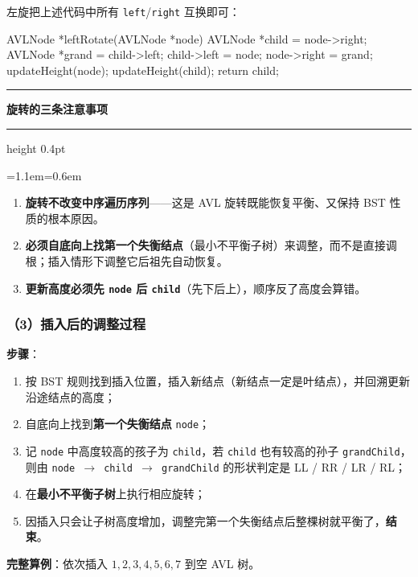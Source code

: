 \documentclass[11pt,openany,UTF8]{ctexbook}
\newcommand{\callouthead}[2]{%
  \par\addvspace{7pt}\noindent
  {\color{#1}\rule[-0.15em]{3pt}{1.05em}}\hspace{0.5em}%
  {\bfseries\color{#1}#2}\par\nobreak\vspace{-0.35em}%
  {\color{rulesep}\hrule height 0.4pt}\nobreak\vspace{0.45em}%
  \begingroup\small\setlength{\parindent}{0pt}%
  \leftskip=1.1em\rightskip=0.6em\noindent\ignorespaces}
\newcommand{\calloutend}{\par\endgroup\addvspace{7pt}}
\newenvironment{callwarn}[1]{\callouthead{warnbar}{#1}}{\calloutend}
\begin{document}
左旋把上述代码中所有 \texttt{left}/\texttt{right} 互换即可：

\begin{codebox}
AVLNode *leftRotate(AVLNode *node) {
    AVLNode *child = node->right;
    AVLNode *grand = child->left;
    child->left  = node;
    node->right  = grand;
    updateHeight(node);
    updateHeight(child);
    return child;
}
\end{codebox}

\begin{callwarn}{旋转的三条注意事项}
\begin{enumerate}
\item \textbf{旋转不改变中序遍历序列}——这是 AVL 旋转既能恢复平衡、又保持 BST 性质的根本原因。
\item \textbf{必须自底向上找第一个失衡结点}（最小不平衡子树）来调整，而不是直接调根；插入情形下调整它后祖先自动恢复。
\item \textbf{更新高度必须先 \texttt{node} 后 \texttt{child}}（先下后上），顺序反了高度会算错。
\end{enumerate}
\end{callwarn}

\subsubsection{（3）插入后的调整过程}

\textbf{步骤}：

\begin{enumerate}
\item 按 BST 规则找到插入位置，插入新结点（新结点一定是叶结点），并回溯更新沿途结点的高度；
\item 自底向上找到\textbf{第一个失衡结点} \texttt{node}；
\item 记 \texttt{node} 中高度较高的孩子为 \texttt{child}，若 \texttt{child} 也有较高的孙子 \texttt{grandChild}，则由 \texttt{node $\to$ child $\to$ grandChild} 的形状判定是 LL / RR / LR / RL；
\item 在\textbf{最小不平衡子树}上执行相应旋转；
\item 因插入只会让子树高度增加，调整完第一个失衡结点后整棵树就平衡了，\textbf{结束}。
\end{enumerate}
\textbf{完整算例}：依次插入 $1,2,3,4,5,6,7$ 到空 AVL 树。
\end{document}
